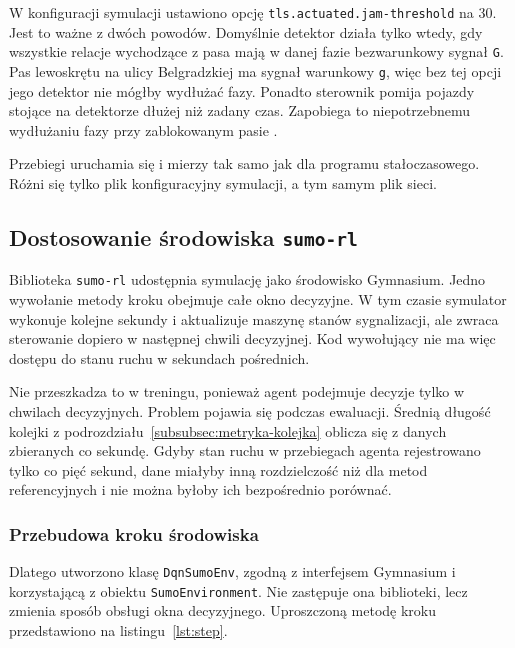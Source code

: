 W konfiguracji symulacji ustawiono opcję \texttt{tls.actuated.jam-threshold} na 30. Jest to ważne z dwóch powodów. Domyślnie detektor działa tylko wtedy, gdy wszystkie relacje wychodzące z pasa mają w danej fazie bezwarunkowy sygnał \texttt{G}. Pas lewoskrętu na ulicy Belgradzkiej ma sygnał warunkowy \texttt{g}, więc bez tej opcji jego detektor nie mógłby wydłużać fazy. Ponadto sterownik pomija pojazdy stojące na detektorze dłużej niż zadany czas. Zapobiega to niepotrzebnemu wydłużaniu fazy przy zablokowanym pasie \cite{sumoTrafficLights}.

Przebiegi uruchamia się i mierzy tak samo jak dla programu stałoczasowego. Różni się tylko plik konfiguracyjny symulacji, a tym samym plik sieci.

\subsection{Dostosowanie środowiska \texttt{sumo-rl}}
\label{subsec:wrapper}

Biblioteka \texttt{sumo-rl} udostępnia symulację jako środowisko Gymnasium. Jedno wywołanie metody kroku obejmuje całe okno decyzyjne. W tym czasie symulator wykonuje kolejne sekundy i aktualizuje maszynę stanów sygnalizacji, ale zwraca sterowanie dopiero w następnej chwili decyzyjnej. Kod wywołujący nie ma więc dostępu do stanu ruchu w sekundach pośrednich.

Nie przeszkadza to w treningu, ponieważ agent podejmuje decyzje tylko w chwilach decyzyjnych. Problem pojawia się podczas ewaluacji. Średnią długość kolejki z podrozdziału~\ref{subsubsec:metryka-kolejka} oblicza się z danych zbieranych co sekundę. Gdyby stan ruchu w przebiegach agenta rejestrowano tylko co pięć sekund, dane miałyby inną rozdzielczość niż dla metod referencyjnych i nie można byłoby ich bezpośrednio porównać.

\subsubsection{Przebudowa kroku środowiska}
\label{subsubsec:przebudowa-kroku}

Dlatego utworzono klasę \texttt{DqnSumoEnv}, zgodną z interfejsem Gymnasium i korzystającą z obiektu \texttt{SumoEnvironment}. Nie zastępuje ona biblioteki, lecz zmienia sposób obsługi okna decyzyjnego. Uproszczoną metodę kroku przedstawiono na listingu~\ref{lst:step}.

